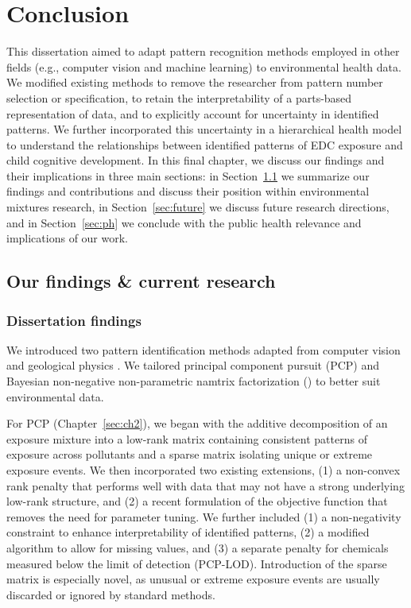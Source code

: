 \chapter{Conclusion}\label{sec:conclusion}
\clearpage
This dissertation aimed to adapt pattern recognition methods employed in other fields (e.g., computer vision and machine learning) to environmental health data. We modified existing methods to remove the researcher from pattern number selection or specification, to retain the interpretability of a parts-based representation of data, and to explicitly account for uncertainty in identified patterns. We further incorporated this uncertainty in a hierarchical health model to understand the relationships between identified patterns of EDC exposure and child cognitive development. In this final chapter, we discuss our findings and their implications in three main sections: in Section~\ref{sec:summarize} we summarize our findings and contributions and discuss their position within environmental mixtures research, in Section~\ref{sec:future} we discuss future research directions, and in Section~\ref{sec:ph} we conclude with the public health relevance and implications of our work.

\section{Our findings \& current research}\label{sec:summarize}

\subsection{Dissertation findings}\label{sec:findings}
We introduced two pattern identification methods adapted from computer vision and geological physics \citep{candes2011robust, zhou2010stable, holtzman2018machine}. We tailored principal component pursuit (PCP) and Bayesian non-negative non-parametric namtrix factorization (\bnmfc) to better suit environmental data.

For PCP (Chapter~\ref{sec:ch2}), we began with the additive decomposition of an exposure mixture into a low-rank matrix containing consistent patterns of exposure across pollutants and a sparse matrix isolating unique or extreme exposure events. We then incorporated two existing extensions, (1) a non-convex rank penalty that performs well with data that may not have a strong underlying low-rank structure, and (2) a recent formulation of the objective function that removes the need for parameter tuning. We further included (1) a non-negativity constraint to enhance interpretability of identified patterns, (2) a modified algorithm to allow for missing values, and (3) a separate penalty for chemicals measured below the limit of detection (PCP-LOD). Introduction of the sparse matrix is especially novel, as unusual or extreme exposure events are usually discarded or ignored by standard methods.

